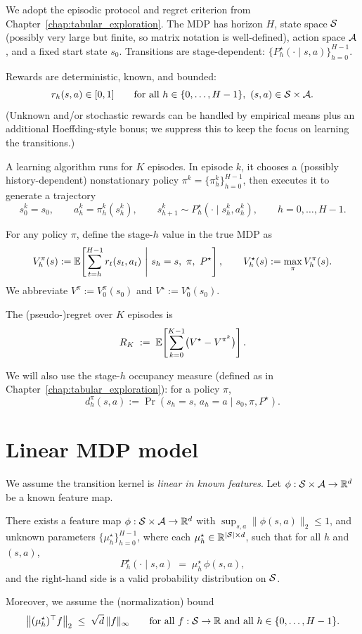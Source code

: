 We adopt the episodic protocol and regret criterion from
Chapter~\ref{chap:tabular_exploration}.  The MDP has horizon $H$, state space $\mathcal{S}$
(possibly very large but finite, so matrix notation is well-defined), action space
$\mathcal{A}$, and a fixed start state $s_0$.  Transitions are stage-dependent:
$\{P_h^\star(\cdot\mid s,a)\}_{h=0}^{H-1}$.

Rewards are deterministic, known, and bounded:
\[
r_h(s,a)\in[0,1]\qquad\text{for all }h\in\{0,\dots,H-1\},\ (s,a)\in\mathcal{S}\times\mathcal{A}.
\]
(Unknown and/or stochastic rewards can be handled by empirical means plus an
additional Hoeffding-style bonus; we suppress this to keep the focus on learning
the transitions.)

A learning algorithm runs for $K$ episodes.  In episode $k$, it chooses a (possibly
history-dependent) nonstationary policy $\pi^k=\{\pi_h^k\}_{h=0}^{H-1}$, then executes it to
generate a trajectory
\[
s_0^k=s_0,\qquad a_h^k=\pi_h^k(s_h^k),\qquad s_{h+1}^k\sim P_h^\star(\cdot\mid s_h^k,a_h^k),
\qquad h=0,\dots,H-1.
\]

For any policy $\pi$, define the stage-$h$ value in the true MDP as
\[
V_h^\pi(s)
:= \E\!\left[\sum_{t=h}^{H-1} r_t(s_t,a_t)\ \middle|\ s_h=s,\ \pi,\ P^\star \right],
\qquad
V_h^\star(s):=\max_{\pi}V_h^\pi(s).
\]
We abbreviate $V^\pi:=V_0^\pi(s_0)$ and $V^\star:=V_0^\star(s_0)$.

The (pseudo-)regret over $K$ episodes is
\[
R_K \;:=\; \mathbb{E}\!\left[\sum_{k=0}^{K-1}\bigl(V^\star - V^{\pi^k}\bigr)\right].
\]

We will also use the stage-$h$ occupancy measure (defined as in
Chapter~\ref{chap:tabular_exploration}): for a policy $\pi$,
\[
d_h^\pi(s,a) := \Pr(s_h=s,\,a_h=a\mid s_0,\pi,P^\star).
\]


\section{Linear MDP model}
\label{sec:linear_mdp_model}

We assume the transition kernel is \emph{linear in known features}.  Let
$\phi:\mathcal{S}\times\mathcal{A}\to\mathbb{R}^d$ be a known feature map.

\begin{assumption}\label{assump:linear_mdp}
There exists a feature map $\phi:\mathcal{S}\times\mathcal{A}\to\mathbb{R}^d$ with
$\sup_{s,a}\|\phi(s,a)\|_2\le 1$, and unknown parameters
$\{\mu_h^\star\}_{h=0}^{H-1}$, where each $\mu_h^\star\in\mathbb{R}^{|\mathcal{S}|\times d}$, such that
for all $h$ and $(s,a)$,
\[
P_h^\star(\cdot\mid s,a) \;=\; \mu_h^\star\,\phi(s,a),
\]
and the right-hand side is a valid probability distribution on $\mathcal{S}$.

Moreover, we assume the (normalization) bound
\[
\big\|(\mu_h^\star)^\top f\big\|_2 \;\le\; \sqrt{d}\,\|f\|_\infty
\qquad \text{for all } f:\mathcal{S}\to\mathbb{R} \text{ and all } h\in\{0,\dots,H-1\}.
\]
\end{assumption}

